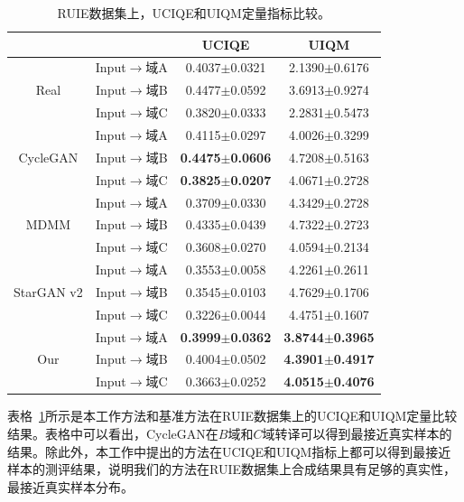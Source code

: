 \begin{table}[htp]
  \centering
  \caption{RUIE数据集上，UCIQE和UIQM定量指标比较。}
    \begin{tabular}{c|c|cc}
    \toprule
    \multicolumn{2}{c|}{} & \multicolumn{1}{c}{UCIQE} & UIQM \\
    \midrule
    \multirow{3}[2]{*}{Real} & Input$\rightarrow$域A & 0.4037$\pm$0.0321 & 2.1390$\pm$0.6176 \\
                             & Input$\rightarrow$域B & 0.4477$\pm$0.0592 & 3.6913$\pm$0.9274 \\
                             & Input$\rightarrow$域C & 0.3820$\pm$0.0333 & 2.2831$\pm$0.5473 \\
    \midrule
    \multirow{3}[2]{*}{CycleGAN} & Input$\rightarrow$域A & 0.4115$\pm$0.0297& 4.0026$\pm$0.3299 \\
                                 & Input$\rightarrow$域B & \textbf{0.4475$\pm$0.0606} &4.7208$\pm$0.5163 \\
                                 & Input$\rightarrow$域C & \textbf{0.3825$\pm$0.0207} &4.0671$\pm$0.2728  \\
    \midrule
    \multirow{3}[2]{*}{MDMM} & Input$\rightarrow$域A & 0.3709$\pm$0.0330 & 4.3429$\pm$0.2728 \\
          & Input$\rightarrow$域B & 0.4335$\pm$0.0439 & 4.7322$\pm$0.2723 \\
          & Input$\rightarrow$域C & 0.3608$\pm$0.0270 & 4.0594$\pm$0.2134 \\
    \midrule
    \multirow{3}[2]{*}{StarGAN v2} &Input$\rightarrow$域A & 0.3553$\pm$0.0058 & 4.2261$\pm$0.2611 \\
          & Input$\rightarrow$域B & 0.3545$\pm$0.0103 & 4.7629$\pm$0.1706 \\
          & Input$\rightarrow$域C & 0.3226$\pm$0.0044 & 4.4751$\pm$0.1607 \\
    \midrule
    \multirow{3}[2]{*}{Our} & Input$\rightarrow$域A & \textbf{0.3999$\pm$0.0362} & \textbf{3.8744$\pm$0.3965} \\
          & Input$\rightarrow$域B & 0.4004$\pm$0.0502 & \textbf{4.3901$\pm$0.4917} \\
          & Input$\rightarrow$域C & 0.3663$\pm$0.0252 & \textbf{4.0515$\pm$0.4076} \\
    \bottomrule
    \end{tabular}%
  \label{tab:underwater_matric_ruie}%
\end{table}%

表格~\ref{tab:underwater_matric_ruie}所示是本工作方法和基准方法在RUIE数据集上的UCIQE和UIQM定量比较结果。表格中可以看出，CycleGAN在$B$域和$C$域转译可以得到最接近真实样本的结果。除此外，本工作中提出的方法在UCIQE和UIQM指标上都可以得到最接近样本的测评结果，说明我们的方法在RUIE数据集上合成结果具有足够的真实性，最接近真实样本分布。

